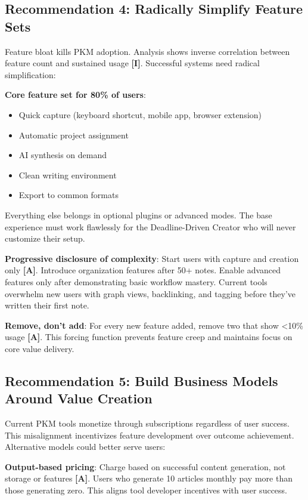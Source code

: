 \documentclass[a4paper,11pt]{article}
\newcommand{\ilabel}{\textbf{\textcolor{icolor}{[I]}}}
\newcommand{\alabel}{\textbf{\textcolor{acolor}{[A]}}}
\begin{document}
\subsection{Recommendation 4: Radically Simplify Feature Sets}

Feature bloat kills PKM adoption. Analysis shows inverse correlation between feature count and sustained usage \ilabel{}. Successful systems need radical simplification:


\textbf{Core feature set for 80\% of users}:

\begin{itemize}
  \item Quick capture (keyboard shortcut, mobile app, browser extension)
  \item Automatic project assignment
  \item AI synthesis on demand
  \item Clean writing environment
  \item Export to common formats
\end{itemize}

Everything else belongs in optional plugins or advanced modes. The base experience must work flawlessly for the Deadline-Driven Creator who will never customize their setup.


\textbf{Progressive disclosure of complexity}: Start users with capture and creation only \alabel{}. Introduce organization features after 50+ notes. Enable advanced features only after demonstrating basic workflow mastery. Current tools overwhelm new users with graph views, backlinking, and tagging before they've written their first note.


\textbf{Remove, don't add}: For every new feature added, remove two that show <10\% usage \alabel{}. This forcing function prevents feature creep and maintains focus on core value delivery.


\subsection{Recommendation 5: Build Business Models Around Value Creation}

Current PKM tools monetize through subscriptions regardless of user success. This misalignment incentivizes feature development over outcome achievement. Alternative models could better serve users:


\textbf{Output-based pricing}: Charge based on successful content generation, not storage or features \alabel{}. Users who generate 10 articles monthly pay more than those generating zero. This aligns tool developer incentives with user success.
\end{document}

